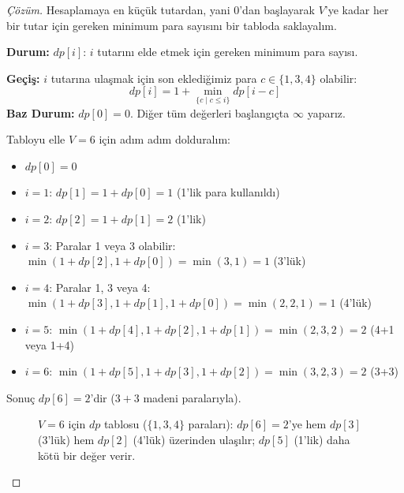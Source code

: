 \begin{proof}[Çözüm]
Hesaplamaya en küçük tutardan, yani $0$'dan başlayarak $V$'ye kadar her bir tutar için gereken minimum para sayısını bir tabloda saklayalım.

\textbf{Durum:}
$dp[i]$: $i$ tutarını elde etmek için gereken minimum para sayısı.

\textbf{Geçiş:}
$i$ tutarına ulaşmak için son eklediğimiz para $c \in \{1, 3, 4\}$ olabilir:
\[
dp[i] = 1 + \min_{\{c \mid c \le i\}} dp[i - c]
\]
\textbf{Baz Durum:}
$dp[0] = 0$. Diğer tüm değerleri başlangıçta $\infty$ yaparız.

Tabloyu elle $V=6$ için adım adım dolduralım:
\begin{itemize}
    \item $dp[0] = 0$
    \item $i=1$: $dp[1] = 1 + dp[0] = 1$ (1'lik para kullanıldı)
    \item $i=2$: $dp[2] = 1 + dp[1] = 2$ (1'lik)
    \item $i=3$: Paralar 1 veya 3 olabilir: $\min(1+dp[2], 1+dp[0]) = \min(3, 1) = 1$ (3'lük)
    \item $i=4$: Paralar 1, 3 veya 4: $\min(1+dp[3], 1+dp[1], 1+dp[0]) = \min(2, 2, 1) = 1$ (4'lük)
    \item $i=5$: $\min(1+dp[4], 1+dp[2], 1+dp[1]) = \min(2, 3, 2) = 2$ (4+1 veya 1+4)
    \item $i=6$: $\min(1+dp[5], 1+dp[3], 1+dp[2]) = \min(3, 2, 3) = 2$ (3+3)
\end{itemize}

Sonuç $dp[6] = 2$'dir ($3+3$ madeni paralarıyla).

\begin{figure}[ht]
\centering
{}
\caption{$V=6$ için $dp$ tablosu ($\{1, 3, 4\}$ paraları): $dp[6]=2$'ye hem
$dp[3]$ (3'lük) hem $dp[2]$ (4'lük) üzerinden ulaşılır; $dp[5]$ (1'lik) daha kötü
bir değer verir.}
\end{figure}


\end{proof}
